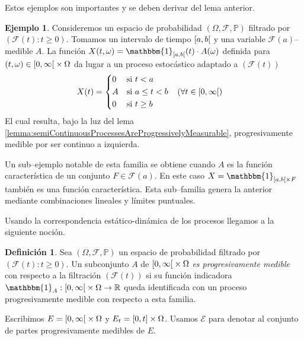 \documentclass{report}
\newcommand{\leftOpenInterval}{\left]}
\newcommand{\rightOpenInterval}{\right[}
\newcommand{\leftClosedInterval}{\left[}
\newcommand{\rightClosedInterval}{\right]}
\newcommand{\interval}[3]{%
    \ifstrequal{#1}{oo}{%
      \leftOpenInterval #2, #3 \rightOpenInterval%
    }{%
      \ifstrequal{#1}{co}{%
        \leftClosedInterval #2, #3 \rightOpenInterval%
      }{%
        \ifstrequal{#1}{oc}{
          \leftOpenInterval #2, #3 \rightClosedInterval%
        }{%
          \ifstrequal{#1}{cc}{
            \leftClosedInterval #2, #3 \rightClosedInterval
          }{%
          }%
        }%
      }%
    }%
  }
\newcommand{\characteristic}{\mathbbm{1}}
\newcommand{\prob}{\mathbb{P}}
\newcommand{\events}{\mathcal{F}}
\newcommand{\borel}{\mathscr{B}}
\newcommand{\progressiveAlgebra}{\mathscr{E}}
\newcommand{\realNumbers}{\mathbb{R}}
\theoremstyle{plain}
\theoremstyle{remark}
\theoremstyle{definition}
\newtheorem{definition}{Definición}
\newtheorem{example}{Ejemplo}
\begin{document}
Estos ejemplos son importantes y se deben derivar del lema anterior.
\begin{example}
  \label{example:basicProgressiveProcess}
  Consideremos un espacio de probabilidad \((\Omega, \events, \prob)\) filtrado por \((\events(t) : t \geq 0)\).
  Tomamos un intervalo de tiempo \(\interval{co}{a}{b}\) y una variable \(\events(a)\)--medible \(A\).
  La función 
  \(X(t, \omega) = \characteristic_{\interval{co}{a}{b}}(t) \cdot A(\omega)\) definida para \((t, \omega) \in \interval{co}{0}{\infty} \times \Omega\)
  da lugar a un proceso estocástico adaptado a \((\events(t))\)
  \begin{align}
    &X(t)
    =
    \left\{\begin{aligned}
      & 0
        && \text{si } t < a
      \\
      & A
      && \text{si } a \leq t < b
      \\
      & 0
        && \text{si } t \geq b
    \end{aligned}\right.
    && (\forall t \in \interval{co}{0}{\infty})
  \end{align}
  El cual resulta, bajo la luz del lema \ref{lemma:semiContinuousProcessesAreProgressivelyMeasurable}, progresivamente medible por ser continuo a izquierda.

  Un sub--ejemplo notable de esta familia se obtiene cuando \(A\) es la función característica de un conjunto \(F \in \events(a)\).
  En este caso \(X = \characteristic_{\interval{co}{a}{b} \times F}\) también es una función característica.
  Esta sub--familia genera la anterior mediante combinaciones lineales y límites puntuales.
\end{example}


Usando la correspondencia estático-dinámica de los procesos llegamos a la siguiente noción. 
\begin{definition}
  Sea \((\Omega, \events, \prob)\) un espacio de probabilidad filtrado por \((\events(t) : t \geq 0)\).
  Un subconjunto \(A\) de \(\interval{co}{0}{\infty} \times \Omega\) \emph{es progresivamente medible} con respecto a la filtración \((\events(t))\) si su función indicadora \(\characteristic_A : \interval{co}{0}{\infty} \times \Omega \rightarrow \realNumbers\) queda identificada con un proceso progresivamente medible con respecto a esta familia.

  Escribimos \(E = \interval{co}{0}{\infty} \times \Omega\) y \(E_t = \interval{cc}{0}{t} \times \Omega\). Usamos \(\progressiveAlgebra\) para denotar al conjunto de partes progresivamente medibles de \(E\).
\end{definition}
\end{document}
